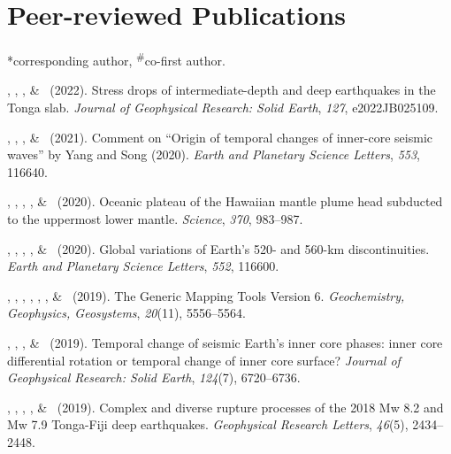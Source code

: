 \section{Peer-reviewed Publications}
\newcommand{\Revision}{\emph{under revision}}
\newcommand{\CS}{*} %
\newcommand{\CF}{\textsuperscript{\#}} %

\CS corresponding author, \CF co-first author.
\begin{etaremune}
\item \Me\CS, \SWei, \WWang, \& \FWang\ (2022).
    Stress drops of intermediate-depth and deep earthquakes in the Tonga slab.
    \emph{Journal of Geophysical Research: Solid Earth}, \emph{127}, e2022JB025109.
\item \JYao, \Me, \LSun, \& \LWen\ (2021).
    Comment on ``Origin of temporal changes of inner-core seismic waves'' by Yang and Song (2020).
    \emph{Earth and Planetary Science Letters}, \emph{553}, 116640.
\item \SWei, \PShearer, \CLithgowBertelloni, \LStixrude, \& \Me\ (2020).
    Oceanic plateau of the Hawaiian mantle plume head subducted to the uppermost lower mantle.
    \emph{Science}, \emph{370}, 983--987.
\item \Me\CS, \MLv, \SWei, \SDorfman, \& \PShearer\ (2020).
    Global variations of Earth's 520- and 560-km discontinuities.
    \emph{Earth and Planetary Science Letters}, \emph{552}, 116600. \\
\item
    \PWessel, \JLuis, \LUieda, \RScharroo, \FWobbe, \WSmith, \& \Me\ (2019).
    The Generic Mapping Tools Version 6.
    \emph{Geochemistry, Geophysics, Geosystems}, \emph{20}(11), 5556--5564.
\item
    \JYao, \Me, \LSun, \& \LWen\ (2019).
    Temporal change of seismic Earth's inner core phases: inner core differential rotation or temporal change of inner core surface?
    \emph{Journal of Geophysical Research: Solid Earth}, \emph{124}(7), 6720--6736.
\item
    \WFan, \SWei, \Me, \JMcGurie, \& \DWiens\ (2019).
    Complex and diverse rupture processes of the 2018 Mw 8.2 and Mw 7.9 Tonga-Fiji deep earthquakes.
    \emph{Geophysical Research Letters}, \emph{46}(5), 2434--2448.

\end{etaremune}
